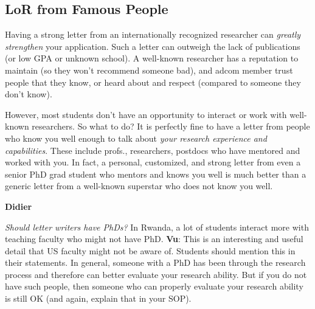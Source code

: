 \documentclass[oneside,11pt,dvipsnames]{book}
\newenvironment{commentbox}[1][]{
  \small
  \begin{mybox}
    {\small \textbf{#1}}
  }{
  \end{mybox}
}
\begin{document}
\subsection{LoR from Famous People}  Having a strong letter from an internationally recognized researcher can \emph{greatly strengthen} your application. Such a letter can outweigh the lack of publications (or low GPA or unknown school). A well-known researcher has a reputation to maintain (so they won't recommend someone bad), and adcom member trust people that they know, or heard about and respect (compared to someone they don't know).



However, most students don't have an opportunity to interact or work with well-known researchers.  
So what to do? It is perfectly fine to have a letter from people who know you well enough to talk about \emph{your research experience and capabilities}. These include profs., researchers, postdocs who have mentored and worked with you. In fact, a personal, customized, and strong letter from even a senior PhD grad student who mentors and knows you well is much better than a generic letter from a well-known superstar who does not know you well. 



\begin{commentbox}[Didier]
    \emph{Should letter writers have PhDs?}  In Rwanda, a lot of students interact more with teaching faculty who might not have PhD.
    \tcblower
    \textbf{Vu}: This is an interesting and useful detail that US faculty might not be aware of. Students should mention this in their statements. In general, someone with a PhD has been through the research process and therefore can better evaluate your research ability.  But if you do not have such people, then someone who can properly evaluate your research ability is still OK (and again, explain that in your SOP).
  \end{commentbox}
\end{document}
